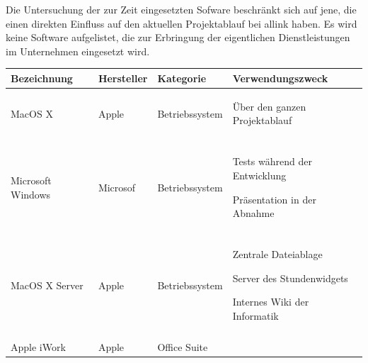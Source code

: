 Die Untersuchung der zur Zeit eingesetzten Sofware beschränkt sich auf jene,
die einen direkten Einfluss auf den aktuellen Projektablauf bei allink haben.
Es wird keine Software aufgelistet, die zur Erbringung der eigentlichen 
Dienstleistungen im Unternehmen eingesetzt wird.

\begin{center}
    \begin{longtable}{lllp{6cm}}
        \toprule \textbf{Bezeichnung} & \textbf{Hersteller} & \textbf{Kategorie} & \textbf{Verwendungszweck} \\
        \midrule MacOS X & Apple & Betriebssystem & 
            \begin{minipage}[t]{6cm}
                \begin{compactitem}
                    \item Über den ganzen Projektablauf
                \end{compactitem}
            \end{minipage}
            \\\\
        \midrule Microsoft Windows & Microsof & Betriebssystem & 
            \begin{minipage}[t]{6cm}
                \begin{compactitem}
                    \item Tests während der Entwicklung
                    \item Präsentation in der Abnahme
                \end{compactitem}
            \end{minipage}
            \\\\
        \midrule MacOS X Server & Apple & Betriebssystem &
            \begin{minipage}[t]{6cm}
                \begin{compactitem}
                    \item Zentrale Dateiablage
                    \item Server des Stundenwidgets
                    \item Internes Wiki der Informatik
                \end{compactitem}
            \end{minipage}
            \\\\
        \midrule Apple iWork & Apple & Office Suite &
            \begin{minipage}[t]{6cm}

\end{minipage}
\end{longtable}
\end{center}
